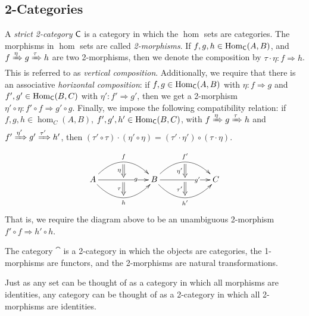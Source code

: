  \subsection{2-Categories} \label{ApdxSec:2-categories}


 \begin{definition}
   A \emph{strict 2-category} $\text{\sf C}$ is a category in which the $\hom$ sets are categories.
   The morphisms in $\hom$ sets are called \emph{2-morphisms}. If $f,g,h\in
   \operatorname{Hom}_{\text{\sf C}}(A,B)$, and $f\xRightarrow\eta g\xRightarrow\tau h$ are two 2-morphisms, then
   we denote the composition by $\tau\cdot\eta:f\Rightarrow h$. This is referred to as
   \emph{vertical composition}. Additionally, we require that there is an associative
   \emph{horizontal composition}: if $f,g\in \operatorname{Hom}_{\text{\sf C}}(A,B)$ with $\eta:f\Rightarrow g$ and
   $f',g'\in \operatorname{Hom}_{\text{\sf C}}(B,C)$ with $\eta':f'\Rightarrow g'$, then we get a 2-morphism
   $\eta'\circ \eta:f'\circ f\Rightarrow g'\circ g$. Finally, we impose the following
   compatibility relation: if $f,g,h\in\hom_C(A,B)$, $f',g',h'\in\operatorname{Hom}_{\text{\sf C}}(B,C)$, with
   $f\xRightarrow\eta g\xRightarrow\tau h$ and $f'\xRightarrow{\eta'}
   g'\xRightarrow{\tau'} h'$, then $(\tau'\circ\tau)\cdot(\eta'\circ\eta) =
   (\tau'\cdot\eta')\circ(\tau\cdot\eta)$.
   \[\xymatrix@+3pc{
    A \ar@/^5ex/[r]^f_{}="a" \ar[r]|(.7)g^{}="b"_{}="c" \ar@/_5ex/[r]_h^{}="d"
    & B \ar@/^5ex/[r]^{f'}_{}="a'" \ar[r]|(.7){g'}^{}="b'"_{}="c'" \ar@/_5ex/[r]_{h'}^{}="d'"
    & C
    \ar@{=>}_\eta "a";"b" \ar@{=>}_\tau "c";"d"
    \ar@{=>}_{\eta'} "a'";"b'" \ar@{=>}_{\tau'} "c'";"d'"
   }\]
   That is, we require the diagram above to be an unambiguous 2-morphism $f'\circ
   f\Rightarrow h'\circ h$.
 \end{definition}
 \begin{example}
   The category $\cat$ is a 2-category in which the objects are categories, the
   1-morphisms are functors, and the 2-morphisms are natural transformations.
 \end{example}
 \begin{example}
   Just as any set can be thought of as a category in which all morphisms are identities,
   any category can be thought of as a 2-category in which all 2-morphisms are
   identities.
 \end{example}

